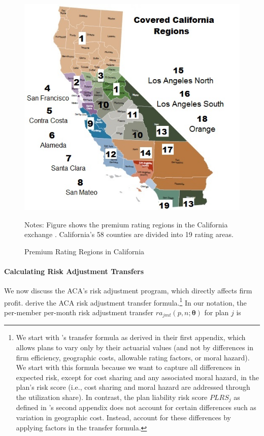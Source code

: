 \documentclass[12pt]{article}
\begin{document}
\begin{figure}[htbp]
\caption{Premium Rating Regions in California}
\label{rating_area_partitions}
\centering
\includegraphics[scale=.45]{finals/pics/CA_Rating_Regions2.jpg}	

\begin{footnotesize}
 \begin{flushleft}
Notes: Figure shows the premium rating regions in the California exchange \citep{CARATE2016}. California's 58 counties are divided into 19 rating areas. 
\end{flushleft}
\end{footnotesize}

\end{figure}  
 
 
\paragraph{Calculating Risk Adjustment Transfers} 
 
We now discuss the ACA's risk adjustment program, which directly affects firm profit. \citet{Pope2014} derive the ACA risk adjustment transfer formula.\footnote{We start with \citet{Pope2014}'s transfer formula as derived in their first appendix, which allows plans to vary only by their actuarial values (and not by differences in firm efficiency, geographic costs, allowable rating factors, or moral hazard).  We start with this formula because we want to capture  all differences in expected risk, except for cost sharing and any associated moral hazard, in the plan's risk score (i.e., cost sharing and moral hazard are addressed through the utilization share).  In contrast, the plan liability risk score   $PLRS_j$ as defined in \citet{Pope2014}'s second appendix does not account for certain differences such as variation in geographic cost.  Instead, \citet{Pope2014} account for these differences by applying factors in the transfer formula.}  In our notation, the per-member per-month risk adjustment transfer $ra_{jmt}(\textit{p},\textit{n};\boldsymbol{\theta})$ for plan $j$ is
\end{document}
